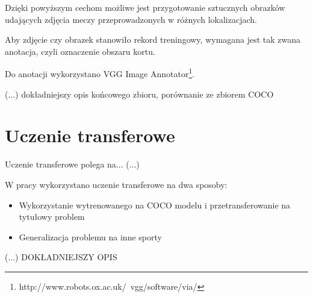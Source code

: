 Dzięki powyższym cechom możliwe jest przygotowanie sztucznych obrazków udających zdjęcia meczy przeprowadzonych w różnych lokalizacjach.

Aby zdjęcie czy obrazek stanowiło rekord treningowy, wymagana jest tak zwana anotacja, czyli oznaczenie obszaru kortu.

Do anotacji wykorzystano VGG Image Annotator\footnote{http://www.robots.ox.ac.uk/~vgg/software/via/}.

(...) dokładniejszy opis końcowego zbioru, porównanie ze zbiorem COCO

\section{Uczenie transferowe}

Uczenie transferowe polega na... (...)

W pracy wykorzystano uczenie transferowe na dwa sposoby:

\begin{itemize}
	\item Wykorzystanie wytrenowanego na COCO modelu i przetransferowanie na tytułowy problem
	\item Generalizacja problemu na inne sporty
\end{itemize}

(...) DOKŁADNIEJSZY OPIS
